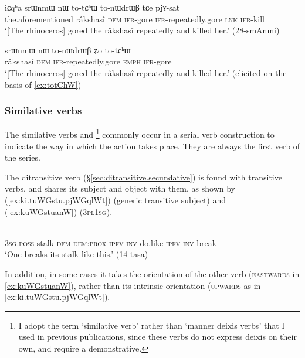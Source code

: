 \begin{exe}
\ex \label{ex:totChW}
\gll iɕqʰa srɯnmɯ nɯ to-tɕʰɯ to-nɯdrɯβ tɕe pjɤ-sat \\
the.aforementioned râkshasî \textsc{dem} \textsc{ifr}-gore \textsc{ifr}-repeatedly.gore  \textsc{lnk} \textsc{ifr}-kill \\
\glt `[The rhinoceros] gored the râkshasî repeatedly and killed her.' (28-smAnmi)
\end{exe}

\begin{exe}
\ex \label{ex:totChW2}
\gll srɯnmɯ nɯ to-nɯdrɯβ ʑo to-tɕʰɯ \\
 râkshasî \textsc{dem}  \textsc{ifr}-repeatedly.gore  \textsc{emph}  \textsc{ifr}-gore \\
 \glt `[The rhinoceros] gored the râkshasî repeatedly and killed her.' (elicited on the basis of \ref{ex:totChW})
\end{exe}	

\subsubsection{Similative verbs} \label{sec:svc.similative.verb}
The similative verbs  and \footnote{I adopt the term `similative verb' \citep{creissels17similative} rather than `manner deixis verbs' that I used in previous publications, since these verbs do not express deixis on their own, and require a demonstrative. } commonly occur in a serial verb construction to indicate the way in which the action takes place. They are always the first verb of the series. 

The ditransitive verb  (§\ref{sec:ditransitive.secundative}) is found with transitive verbs, and shares its subject and object with them, as shown by (\ref{ex:ki.tuWGstu.pjWGqlWt}) (generic transitive subject) and (\ref{ex:kuWGstuanW}) (\textsc{3pl}\fl{}\textsc{1sg}).

\begin{exe}
\ex \label{ex:ki.tuWGstu.pjWGqlWt}
 \\
\textsc{3sg}.\textsc{poss}-stalk \textsc{dem} \textsc{dem}:\textsc{prox} \textsc{ipfv}-\textsc{inv}-do.like \textsc{ipfv}-\textsc{inv}-break \\
\glt `One breaks its stalk like this.' (14-tasa)
\end{exe}	

In addition, in some cases it takes the orientation of the other verb (\textsc{eastwards} in \ref{ex:kuWGstuanW}), rather than its intrinsic orientation (\textsc{upwards} as in \ref{ex:ki.tuWGstu.pjWGqlWt}).

